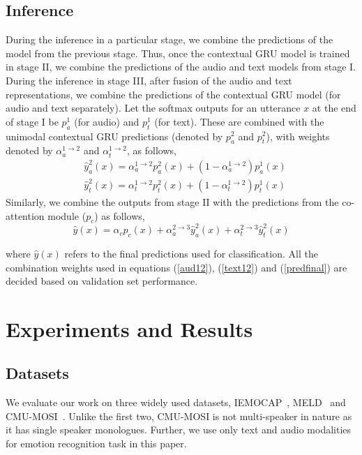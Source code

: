 \documentclass[lettersize,journal]{IEEEtran}
\begin{document}
\subsection{Inference}\label{inference}
During the inference in a particular stage, we combine the predictions of the model from the previous stage. Thus, once the contextual GRU model is trained in stage II, we combine the predictions of the audio and text models from stage I. During the inference in stage III, after fusion of the audio and text representations, we combine the predictions of the contextual GRU model (for audio and text separately). Let the softmax outputs for an utterance $x$ at the end of stage I be $p_a^{1}$ (for audio) and $p_t^{1}$ (for text). These are combined with the unimodal contextual GRU predictions (denoted by $p_a^{2}$ and $p_t^2$), with weights denoted by $\alpha_{a}^{1\rightarrow2}$ and $\alpha_{t}^{1\rightarrow2}$, as follows,
\begin{eqnarray}
&\hat{y}_{a}^2(x) = \alpha_a^{1\rightarrow2} p_a^{2}(x) + (1-\alpha_a^{1\rightarrow2}) p_a^{1}(x)\label{aud12}\\
&\hat{y}_{t}^2(x) = \alpha_t^{1\rightarrow2} p_t^{2}(x) + (1-\alpha_t^{1\rightarrow2}) p_t^{1}(x)\label{text12}
\end{eqnarray}
Similarly, we combine the outputs from stage II with the predictions from the co-attention module ($p_c$) as follows,
\begin{equation}\label{predfinal}
    \hat{y}(x) = \alpha_c p_c(x) + \alpha_a^{2\rightarrow3} \hat{y}_{a}^2(x) + \alpha_t^{2\rightarrow3} \hat{y}_{t}^2(x)
\end{equation}

where $ \hat{y}(x)$ refers to the  final predictions used for  classification. All the combination weights used in equations (\ref{aud12}), (\ref{text12}) and (\ref{predfinal}) are decided based on validation set performance.
\section{Experiments and Results}\label{experiments}
\subsection{Datasets}
We evaluate our work on three widely used datasets, IEMOCAP~\cite{busso2008iemocap}, MELD~\cite{poria2019meld} and CMU-MOSI~\cite{zadeh2016mosi}. Unlike the first two, CMU-MOSI is not multi-speaker  in nature as it has single speaker monologues. Further, we use only text and audio modalities for emotion recognition task in this paper.
\end{document}
